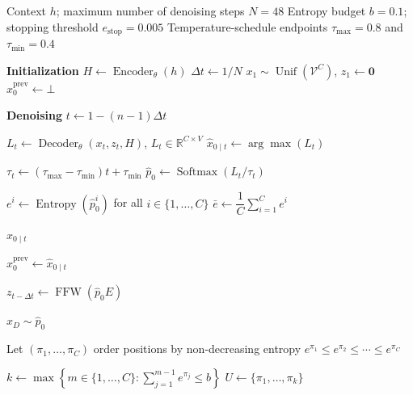 \documentclass[11pt, a4paper, logo, copyright, gdm]{google}
\newcommand{\enc}{\operatorname{Encoder}_{\theta}}
\newcommand{\dec}{\operatorname{Decoder}_{\theta}}
\newcommand{\softmax}{\operatorname{Softmax}}
\newcommand{\unif}{\operatorname{Unif}}
\newcommand{\Vcal}{\mathcal{V}}
\begin{document}
\begin{algorithm}[t!]
\caption{DiffusionGemma Sampling with Entropy-Bounded Denoising
and Adaptive Stopping}
\label{alg:sampling}
\small
\begin{algorithmic}[1]
\Require Context $h$; maximum number of denoising steps $N=48$
\Require Entropy budget $b=0.1$;
         stopping threshold $e_{\mathrm{stop}}=0.005$
\Require Temperature-schedule endpoints
         $\tau_{\max}=0.8$ and $\tau_{\min}=0.4$

\Statex \textbf{Initialization}
\State $H \gets \enc(h)$
\State $\Delta t \gets 1/N$
\State $x_1 \sim \unif(\Vcal^C)$,
    \quad $z_1 \gets \boldsymbol{0}$
\State $\hat{x}_0^{\mathrm{prev}} \gets \bot$

\Statex \textbf{Denoising}
    \State $t \gets 1-(n-1)\Delta t$

    \State $L_t \gets \dec(x_t,z_t,H)$,
        \quad $L_t\in\mathbb{R}^{C\times V}$
    \State $\hat{x}_{0\mid t} \gets \arg\max(L_t)$

    \State $\tau_t \gets
        (\tau_{\max}-\tau_{\min})t+\tau_{\min}$
    \State $\hat{p}_0 \gets
        \softmax(L_t/\tau_t)$

    \State $e^i \gets
        \operatorname{Entropy}(\hat{p}_0^i)$
        for all $i\in\{1,\ldots,C\}$
    \State $\bar{e} \gets
        \dfrac{1}{C}\sum_{i=1}^{C}e^i$

        \State \Return $\hat{x}_{0\mid t}$
    \EndIf

    \State $\hat{x}_0^{\mathrm{prev}}
        \gets \hat{x}_{0\mid t}$

        \State $z_{t-\Delta t} \gets
            \operatorname{FFW}(\hat{p}_0E)$

        \State $x_D \sim \hat{p}_0$

        \State Let $(\pi_1,\ldots,\pi_C)$ order positions
            by non-decreasing entropy
        \Statex \hspace{\algorithmicindent}
            $e^{\pi_1}\leq e^{\pi_2}\leq\cdots\leq e^{\pi_C}$

        \State $k \gets
            \displaystyle\max\left\{
                m\in\{1,\ldots,C\}:
                \sum_{j=1}^{m-1}e^{\pi_j}\leq b
            \right\}$
        \State $U \gets \{\pi_1,\ldots,\pi_k\}$


\end{algorithmic}
\end{algorithm}
\end{document}
